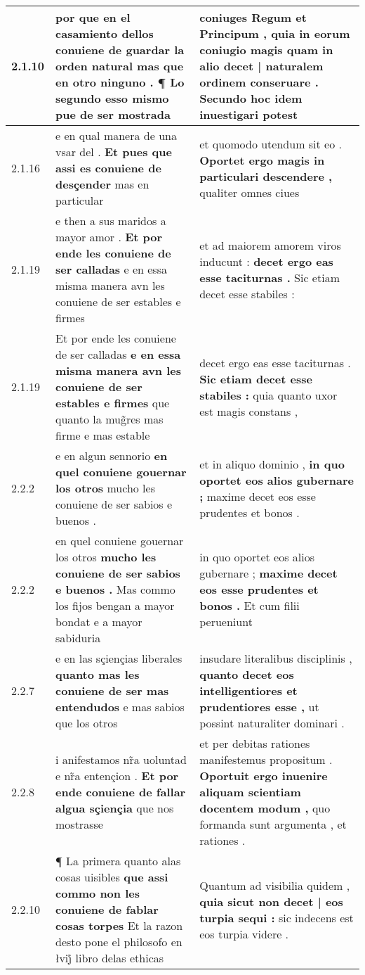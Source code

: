 \begin{tabular}{|p{1cm}|p{6.5cm}|p{6.5cm}|}
2.1.10 & por que en el casamiento \textbf{ dellos conuiene de guardar la orden natural mas que en otro ninguno . } ¶ Lo segundo esso mismo pue de ser mostrada & coniuges Regum et Principum , \textbf{ quia in eorum coniugio magis quam in alio decet | naturalem ordinem conseruare . } Secundo hoc idem inuestigari potest \\\hline
2.1.16 & e en qual manera de una vsar del . \textbf{ Et pues que assi es conuiene de desçender } mas en particular & et quomodo utendum sit eo . \textbf{ Oportet ergo magis in particulari descendere , } qualiter omnes ciues \\\hline
2.1.19 & e then a sus maridos a mayor amor . \textbf{ Et por ende les conuiene de ser calladas } e en essa misma manera avn les conuiene de ser estables e firmes & et ad maiorem amorem viros inducunt : \textbf{ decet ergo eas esse taciturnas . } Sic etiam decet esse stabiles : \\\hline
2.1.19 & Et por ende les conuiene de ser calladas \textbf{ e en essa misma manera avn les conuiene de ser estables e firmes } que quanto la mug̃res mas firme e mas estable & decet ergo eas esse taciturnas . \textbf{ Sic etiam decet esse stabiles : } quia quanto uxor est magis constans , \\\hline
2.2.2 & e en algun sennorio \textbf{ en quel conuiene gouernar los otros } mucho les conuiene de ser sabios e buenos . & et in aliquo dominio , \textbf{ in quo oportet eos alios gubernare ; } maxime decet eos esse prudentes et bonos . \\\hline
2.2.2 & en quel conuiene gouernar los otros \textbf{ mucho les conuiene de ser sabios e buenos . } Mas commo los fijos bengan a mayor bondat e a mayor sabiduria & in quo oportet eos alios gubernare ; \textbf{ maxime decet eos esse prudentes et bonos . } Et cum filii perueniunt \\\hline
2.2.7 & e en las sçiençias liberales \textbf{ quanto mas les conuiene de ser mas entendudos } e mas sabios que los otros & insudare literalibus disciplinis , \textbf{ quanto decet eos intelligentiores et prudentiores esse , } ut possint naturaliter dominari . \\\hline
2.2.8 & i anifestamos nr̃a uoluntad e nr̃a entençion . \textbf{ Et por ende conuiene de fallar algua sçiençia } que nos mostrasse & et per debitas rationes manifestemus propositum . \textbf{ Oportuit ergo inuenire aliquam scientiam docentem modum , } quo formanda sunt argumenta , et rationes . \\\hline
2.2.10 & ¶ La primera quanto alas cosas uisibles \textbf{ que assi commo non les conuiene de fablar cosas torpes } Et la razon desto pone el philosofo en łvij̊ libro delas ethicas & Quantum ad visibilia quidem , \textbf{ quia sicut non decet | eos turpia sequi : } sic indecens est eos turpia videre . \\\hline

\end{tabular}
